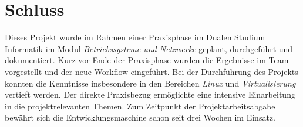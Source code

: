 
\chapter{Schluss}
Dieses Projekt wurde im Rahmen einer Praxisphase im Dualen Studium Informatik im Modul \textit{Betriebssysteme und Netzwerke} geplant, durchgeführt und dokumentiert.
Kurz vor Ende der Praxisphase wurden die Ergebnisse im Team vorgestellt und der neue Workflow eingeführt.
Bei der Durchführung des Projekts konnten die Kenntnisse insbesondere in den Bereichen \textit{Linux} und \textit{Virtualisierung} vertieft werden.
Der direkte Praxisbezug ermöglichte eine intensive Einarbeitung in die projektrelevanten Themen.
Zum Zeitpunkt der Projektarbeitsabgabe bewährt sich die Entwicklungsmaschine schon seit drei Wochen im Einsatz.